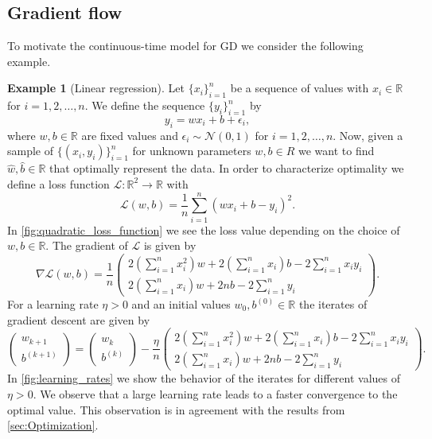 \documentclass[12pt]{article}
\theoremstyle{definition}
\newtheorem{example}[example]{Example}
\numberwithin{equation}{section}
\newcommand{\R}{\mathbb{R}}
\newcommand{\CL}{\mathcal{L}}
\newcommand{\CN}{\mathcal{N}}
\begin{document}
\subsection{Gradient flow}
To motivate the continuous-time model for GD we consider the following example.
\begin{example}[Linear regression]
  \label{ex:linear_regression}
  Let $\{x_i\}_{i=1}^n$ be a sequence of values with $x_i \in \R$ for $i = 1,2,\dots,n$. We define the sequence $\{y_i\}_{i=1}^n$ by
  \begin{equation*}
    y_i = wx_i + b + \epsilon_i,
  \end{equation*}
  where $w,b \in \R$ are fixed values and $\epsilon_i \sim \CN(0,1)$ for $i = 1, 2, \dots, n$.
  Now, given a sample of $\{(x_i, y_i)\}_{i=1}^n$ for unknown parameters $w, b \in R$ we want to find $\hat{w}, \hat{b} \in \R$ that optimally represent the data. In order to characterize optimality we define a loss function $\CL : \R^2 \rightarrow \R$ with 
  \begin{equation}
    \CL (w, b) = \frac{1}{n} \sum_{i=1}^n(wx_i + b - y_i)^2.
  \end{equation}
  In \autoref{fig:quadratic_loss_function} we see the loss value depending on the choice of $w,b \in \R$. The gradient of $\CL$ is given by
  \[
    \nabla \CL (w,b) = \frac{1}{n}
    \begin{pmatrix}
      2\left(\displaystyle\sum_{i=1}^n x_i^2\right)w + 2 \left(\displaystyle\sum_{i=1}^n x_i\right)b - 2 \displaystyle\sum_{i=1}^n x_i y_i \\
      2 \left(\displaystyle\sum_{i=1}^n x_i\right) w + 2nb - 2 \displaystyle\sum_{i=1}^n y_i
    \end{pmatrix}.
  \]
  For a learning rate $\eta > 0$ and an initial values $w_{0},b^{(0)} \in \R$ the iterates of gradient descent are given by
  \begin{equation}
    \begin{pmatrix}
      w_{k+1} \\
      b^{(k+1)}
    \end{pmatrix}
    =
    \begin{pmatrix}
      w_{k} \\
      b^{(k)}
    \end{pmatrix}
    - \frac{\eta}{n}
    \begin{pmatrix}
      2\left(\displaystyle\sum_{i=1}^n x_i^2\right)w + 2 \left(\displaystyle\sum_{i=1}^n x_i\right)b - 2 \displaystyle\sum_{i=1}^n x_i y_i \\
      2 \left(\displaystyle\sum_{i=1}^n x_i\right) w + 2nb - 2 \displaystyle\sum_{i=1}^n y_i
    \end{pmatrix}.
  \end{equation}
  In \autoref{fig:learning_rates} we show the behavior of the iterates for different values of $\eta >0$. We observe that a large learning rate leads to a faster convergence to the optimal value. This observation is in agreement with the results from \autoref{sec:Optimization}.


\end{example}
\end{document}
